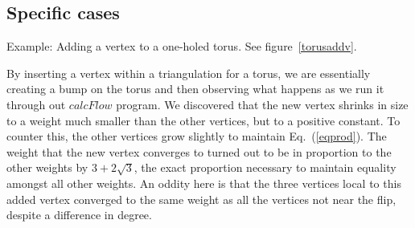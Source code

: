 \documentclass[12pt]{article}
\begin{document}
\subsection{Specific cases}

\noindent Example: Adding a vertex to a one-holed torus. See figure~\ref{torusaddv}. \newline

\noindent By inserting a vertex within a triangulation for a torus, we are essentially creating a bump on the torus and then observing what happens as we run it through out $calcFlow$ program. We discovered that the new vertex shrinks in size to a weight much smaller than the other vertices, but to a positive constant. To counter this, the other vertices grow slightly to maintain Eq.~(\ref{eqprod}). The weight that the new vertex converges to turned out to be in proportion to the other weights by $3+2\sqrt{3}$, the exact proportion necessary to maintain equality amongst all other weights. An oddity here is that the three vertices local to this added vertex converged to the same weight as all the vertices not near the flip, despite a difference in degree.\newline
\end{document}
